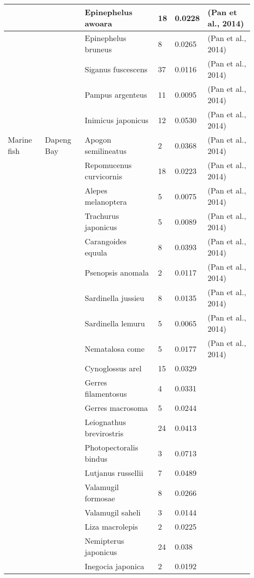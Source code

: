 \begin{center}
\begin{longtable}{ | p{2cm} | p{1.4cm} | p{3cm} | p{1.6cm} | p{1.9cm} | p{2.6cm} | }
 &  & Epinephelus awoara & 18 & 0.0228  & (Pan et al., 2014)  \\ \hline
 &  & Epinephelus bruneus & 8 & 0.0265  & (Pan et al., 2014)  \\ \hline
 &  & Siganus fuscescens & 37 & 0.0116  & (Pan et al., 2014)  \\ \hline
 &  & Pampus argenteus & 11 & 0.0095  & (Pan et al., 2014)  \\ \hline
 &  & Inimicus japonicus & 12 & 0.0530  & (Pan et al., 2014)  \\ \hline
Marine fish & Dapeng Bay & Apogon semilineatus & 2 & 0.0368  & (Pan et al., 2014)  \\ \hline
 &  & Repomucenus curvicornis & 18 & 0.0223  & (Pan et al., 2014)  \\ \hline
 &  & Alepes melanoptera & 5 & 0.0075  & (Pan et al., 2014)  \\ \hline
 &  & Trachurus japonicus & 5 & 0.0089  & (Pan et al., 2014)  \\ \hline
 &  & Carangoides equula & 8 & 0.0393  & (Pan et al., 2014)  \\ \hline
 &  & Psenopsis anomala & 2 & 0.0117  & (Pan et al., 2014)  \\ \hline
 &  & Sardinella jussieu & 8 & 0.0135  & (Pan et al., 2014)  \\ \hline
 &  & Sardinella lemuru & 5 & 0.0065  & (Pan et al., 2014)  \\ \hline
 &  & Nematalosa come & 5 & 0.0177  & (Pan et al., 2014)  \\ \hline
 &  & Cynoglossus arel & 15 & 0.0329  &   \\ \hline
 &  & Gerres filamentosus & 4 & 0.0331  &   \\ \hline
 &  & Gerres macrosoma & 5 & 0.0244  &   \\ \hline
 &  & Leiognathus brevirostris & 24 & 0.0413  &   \\ \hline
 &  & Photopectoralis bindus & 3 & 0.0713  &   \\ \hline
 &  & Lutjanus russellii & 7 & 0.0489  &   \\ \hline
 &  & Valamugil formosae & 8 & 0.0266  &   \\ \hline
 &  & Valamugil saheli & 3 & 0.0144  &   \\ \hline
 &  & Liza macrolepis & 2 & 0.0225  &   \\ \hline
 &  & Nemipterus japonicus & 24 & 0.038  &   \\ \hline
 &  & Inegocia japonica & 2 & 0.0192  &   \\ \hline

\end{longtable}
\end{center}
